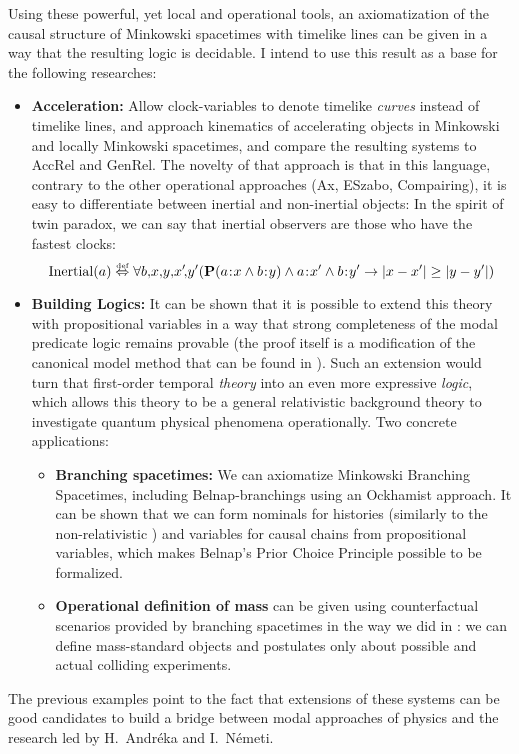 \documentclass[12pt, a4paper]{article}
\newcommand{\defekv}{\overset{\textup{\tiny def}}{ \Leftrightarrow }}
\newcommand{\lthen}{\rightarrow}
\newcommand{\points}[1][0]{\hspace{#1ex}\hspace{-.5ex}:\hspace{-.5ex}\hspace{#1ex}}
\begin{document}
Using these powerful, yet local and operational tools, an axiomatization of the causal structure of Minkowski spacetimes with timelike lines can be given in a way that the resulting logic is decidable. I intend to use this result as a base for the following researches:
\begin{itemize}
\item \textbf{Acceleration:} Allow clock-variables to denote timelike \emph{curves} instead of timelike lines, and approach kinematics of accelerating objects in Minkowski and locally Minkowski spacetimes, and compare the resulting systems to \textsf{AccRel} and \textsf{GenRel}. The novelty of that approach is that in this language, contrary to the other operational approaches (Ax, ESzabo, Compairing), it is easy to differentiate between inertial and non-inertial objects: In the spirit of twin paradox, we can say that inertial observers are those who have the fastest clocks:
    \[ \mathrm{Inertial}(a) \defekv \forall b,\!x,\! y,\!x'\!,\!y'(\mathbf P (a\points x \land b\points y) \land a\points x' \land b\points y' \lthen |x-x'|\geq |y-y'|)   \]
\item \textbf{Building Logics:} It can be shown that it is possible to extend this theory with propositional variables in a way that strong completeness of the modal predicate logic remains provable (the proof itself is a modification of the canonical model method that can be found in \cite{Goldblatt2011}). Such an extension would turn that first-order temporal \emph{theory} into an even more expressive \emph{logic}, which allows this theory to be a general relativistic background theory to investigate quantum physical phenomena operationally. Two concrete applications:
\begin{itemize}
\item \textbf{Branching spacetimes:} We can axiomatize Minkowski Branching Spacetimes, including Belnap-branchings using an Ockhamist approach. It can be shown that we can form nominals for histories (similarly to the non-relativistic \cite{BlackburnHybridOckhamist}) and variables for causal chains from propositional variables, which makes Belnap's \cite{Belnap} Prior Choice Principle possible to be formalized.
\item \textbf{Operational definition of mass} can be given using counterfactual scenarios provided by branching spacetimes in the way we did in \cite{MSz2014}: we can define mass-standard objects and postulates only about possible and actual colliding experiments.
\end{itemize}
\end{itemize}

The previous examples point to the fact that extensions of these systems can be good candidates to build a bridge between modal approaches of physics and the research led by H.~Andréka and I.~Németi.

{}

\end{document}
